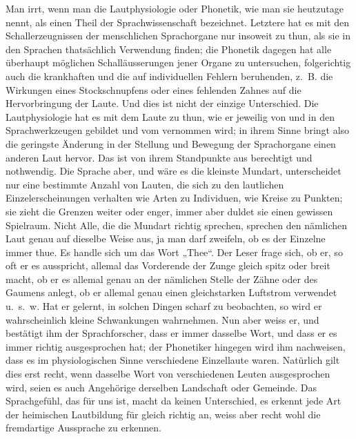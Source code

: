 Man irrt, wenn man die Lautphysiologie oder Phonetik, wie man sie heutzutage nennt, als einen Theil der Sprachwissenschaft bezeichnet. Letztere hat es mit den Schallerzeugnissen der menschlichen Sprachorgane nur insoweit zu thun, als sie in den Sprachen thatsächlich Verwendung finden; die Phonetik dagegen hat alle überhaupt möglichen Schalläusserungen jener Organe zu untersuchen, folgerichtig auch die krankhaften und die auf individuellen Fehlern beruhenden, z.~B. die Wirkungen eines Stockschnupfens oder eines fehlenden Zahnes auf die Hervorbringung der Laute. Und dies ist nicht der einzige Unterschied. Die Lautphysiologie hat es mit dem Laute zu thun, wie er jeweilig von und in den Sprachwerkzeugen gebildet und vom  vernommen wird; in ihrem Sinne bringt also die geringste Änderung in der Stellung und Bewegung der Sprachorgane einen anderen Laut hervor. Das ist von ihrem Standpunkte aus berechtigt und nothwendig. Die Sprache aber, und wäre es die kleinste Mundart, unterscheidet nur eine bestimmte Anzahl von Lauten, die sich zu den lautlichen Einzelerscheinungen verhalten wie Arten zu Individuen, wie \label{sp.34} Kreise zu Punkten; sie zieht die Grenzen weiter oder enger, immer aber duldet sie einen gewissen Spielraum. Nicht Alle, die die Mundart richtig sprechen, sprechen den nämlichen Laut genau auf dieselbe Weise aus, ja man darf zweifeln, ob es der Einzelne immer thue. Es handle sich um das Wort „Thee“. Der Leser frage sich, ob er, so oft er es ausspricht, allemal das Vorderende der Zunge gleich spitz oder breit macht, ob er es allemal genau an der nämlichen Stelle der Zähne oder des Gaumens anlegt, ob er allemal genau einen gleichstarken Luftstrom verwendet u.~s.~w. Hat er gelernt, in solchen Dingen scharf zu beobachten, so wird er wahrscheinlich kleine Schwankungen wahrnehmen. Nun aber weiss er, und bestätigt ihm der Sprachforscher, dass er immer dasselbe Wort, und dass er es immer richtig ausgesprochen hat; der Phonetiker hingegen wird ihm nachweisen, dass es im physiologischen Sinne verschiedene Einzellaute waren. Natürlich gilt dies erst recht, wenn dasselbe Wort von verschiedenen Leuten \label{fp.34} ausgesprochen wird, seien es auch Angehörige derselben Landschaft oder Gemeinde. Das Sprachgefühl, das für uns  ist, macht da keinen Unterschied, es erkennt jede Art der heimischen Lautbildung für gleich richtig an, weiss aber recht wohl die  fremdartige Aussprache zu erkennen.


